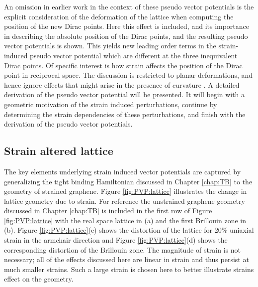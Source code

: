 An omission in earlier work in the context of these pseudo vector potentials is the explicit consideration of the deformation of the lattice when computing the position of the new Dirac points.
Here this effect is included, and its importance in describing the absolute position of the Dirac points, and the resulting pseudo vector potentials is shown.
This yields new leading order terms in the strain-induced pseudo vector potential which are different at the three inequivalent Dirac points.
Of specific interest is how strain affects the position of the Dirac point in reciprocal space.
The discussion is restricted to planar deformations, and hence ignore effects that might arise in the presence of curvature \cite{CastroNeto2009,Vozmediano2010}.
A detailed derivation of the pseudo vector potential will be presented.
It will begin with a geometric motivation of the strain induced perturbations, continue by determining the strain dependencies of these perturbations, and finish with the derivation of the pseudo vector potentials.

\subsection{Strain altered lattice}
The key elements underlying strain induced vector potentials are captured by generalizing the tight binding Hamiltonian discussed in Chapter \ref{chap:TB} to the geometry of strained graphene.
Figure \ref{fig:PVP:lattice} illustrates the change in lattice geometry due to strain.
For reference the unstrained graphene geometry discussed in Chapter \ref{chap:TB} is included in the first row of Figure \ref{fig:PVP:lattice} with the real space lattice in (a) and the first Brillouin zone in (b).
Figure \ref{fig:PVP:lattice}(c) shows the distortion of the lattice for 20\% uniaxial strain in the armchair direction and Figure \ref{fig:PVP:lattice}(d) shows the corresponding distortion of the Brillouin zone.
The magnitude of strain is not necessary; all of the effects discussed here are linear in strain and thus persist at much smaller strains.
Such a large strain is chosen here to better illustrate strains effect on the geometry.

